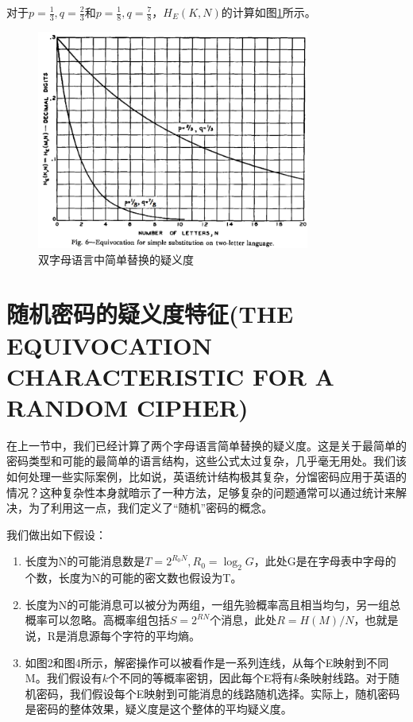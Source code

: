 \documentclass[]{article}
\begin{document}
对于$p=\frac{1}{3},q=\frac{2}{3}$和$p=\frac{1}{8},q=\frac{7}{8}$，$H_E(K,N)$的计算如图\ref{fig:fig6}所示。


\begin{figure}[H]
	\centering
	\includegraphics[width=0.8\textwidth]{fig6.png}
	\caption{双字母语言中简单替换的疑义度}
	\label{fig:fig6}
\end{figure}


\newpage
%   
%

\section{随机密码的疑义度特征(THE EQUIVOCATION CHARACTERISTIC FOR A RANDOM CIPHER)}

在上一节中，我们已经计算了两个字母语言简单替换的疑义度。这是关于最简单的密码类型和可能的最简单的语言结构，这些公式太过复杂，几乎毫无用处。我们该如何处理一些实际案例，比如说，英语统计结构极其复杂，分馏密码应用于英语的情况？这种复杂性本身就暗示了一种方法，足够复杂的问题通常可以通过统计来解决，为了利用这一点，我们定义了“随机”密码的概念。

我们做出如下假设：
\begin{enumerate}
	\item 长度为N的可能消息数是$T=2^{R_0 N},R_0=\log_2{G}$，此处G是在字母表中字母的个数，长度为N的可能的密文数也假设为T。
	\item 长度为N的可能消息可以被分为两组，一组先验概率高且相当均匀，另一组总概率可以忽略。高概率组包括$S=2^{RN}$个消息，此处$R=H(M)/N$，也就是说，R是消息源每个字符的平均熵。
	\item 如图2和图4所示，解密操作可以被看作是一系列连线，从每个E映射到不同M。我们假设有$k$个不同的等概率密钥，因此每个E将有$k$条映射线路。对于随机密码，我们假设每个E映射到可能消息的线路随机选择。实际上，随机密码是密码的整体效果，疑义度是这个整体的平均疑义度。
\end{enumerate}
\end{document}
